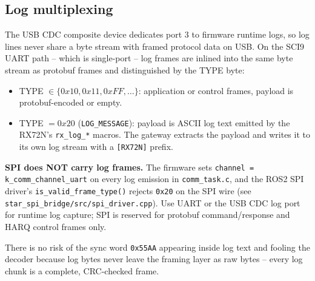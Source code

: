 \subsection{Log multiplexing}

The USB CDC composite device dedicates port 3 to firmware runtime
logs, so log lines never share a byte stream with framed protocol
data on USB. On the SCI9 UART path -- which is single-port -- log
frames are inlined into the same byte stream as protobuf frames and
distinguished by the TYPE byte:

\begin{itemize}
  \item TYPE $\in \{0x10, 0x11, 0xFF, \ldots\}$: application or control
        frames, payload is protobuf-encoded or empty.
  \item TYPE $= 0x20$ (\texttt{LOG\_MESSAGE}): payload is ASCII log text
        emitted by the RX72N's \texttt{rx\_log\_*} macros. The gateway
        extracts the payload and writes it to its own log stream with a
        \texttt{[RX72N]} prefix.
\end{itemize}

\textbf{SPI does NOT carry log frames.} The firmware sets
\texttt{channel = k\_comm\_channel\_uart} on every log emission in
\texttt{comm\_task.c}, and the ROS2 SPI driver's
\texttt{is\_valid\_frame\_type()} rejects \texttt{0x20} on the SPI wire
(see \texttt{star\_spi\_bridge/src/spi\_driver.cpp}). Use UART or the
USB CDC log port for runtime log capture; SPI is reserved for
protobuf command/response and HARQ control frames only.

There is no risk of the sync word \texttt{0x55AA} appearing inside log
text and fooling the decoder because log bytes never leave the framing
layer as raw bytes -- every log chunk is a complete, CRC-checked
frame.
